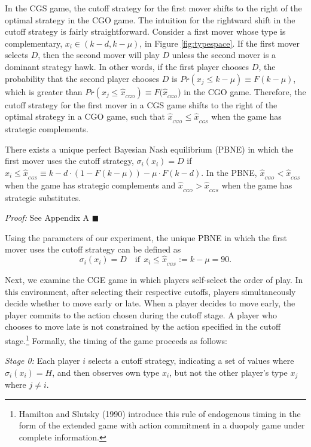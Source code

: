 \documentclass[12pt, letterpaper]{article}
\theoremstyle{plain}
\begin{document}
In the CGS game, the cutoff strategy for the first mover shifts to the right of the optimal strategy in the CGO game. The intuition for the rightward shift in the cutoff strategy is fairly straightforward. Consider a first mover whose type is complementary, $x_i \in (k-d, k-\mu)$, in Figure \ref{fig:typespace}. If the first mover selects $D$, then the second mover will play $D$ unless the second mover is a dominant strategy hawk. In other words, if the first player chooses $D$, the probability that the second player chooses $D$ is  $Pr(x_j\leq k-\mu) \equiv F(k-\mu)$, which is greater than $Pr(x_j\leq\hat{x}_{_{CGO}}) \equiv F(\hat{x}_{_{CGO}}$) in the CGO game. Therefore, the cutoff strategy for the first mover in a CGS game shifts to the right of the optimal strategy in a CGO game, such that $\hat{x}_{_{CGO}}\leq\hat{x}_{_{CGS}}$ when the game has strategic complements.

\begin{lem}
There exists a unique perfect Bayesian Nash equilibrium (PBNE) in which the first mover uses the cutoff strategy, $\sigma_i(x_i)=D$ if $x_i\leq \hat{x}_{_{CGS}} \equiv k-d\cdot(1-F(k-\mu))-\mu\cdot F(k-d)$.  In the PBNE, $\hat{x}_{_{CGO}}<\hat{x}_{_{CGS}}$ when the game has strategic complements and $\hat{x}_{_{CGO}}>\hat{x}_{_{CGS}}$ when the game has strategic substitutes.
\end{lem}\par
\noindent \textit{Proof:} See Appendix A $\blacksquare$

Using the parameters of our experiment, the unique PBNE in which the first mover uses the cutoff strategy can be defined as
\begin{equation}
\sigma_i(x_i)=D \quad \text{if} \ \ x_i\leq \hat{x}_{_{CGS}}:= k-\mu=90. 
\end{equation}

Next, we examine the CGE game in which players self-select the order of play. In this environment, after selecting their respective cutoffs, players simultaneously decide whether to move early or late. When a player decides to move early, the player commits to the action chosen during the cutoff stage. A player who chooses to move late is not constrained by the action specified in the cutoff stage.\footnote{Hamilton and Slutsky (1990) introduce this rule of endogenous timing in the form of the extended game with action commitment in a duopoly game under complete information.} Formally, the timing of the game proceeds as follows:

\textit{Stage 0:} Each player $i$ selects a cutoff strategy, indicating a set of values where $\sigma_i(x_i)=H$, and then observes own type $x_i$, but not the other player's type $x_j$ where $j\neq i$.
\end{document}
